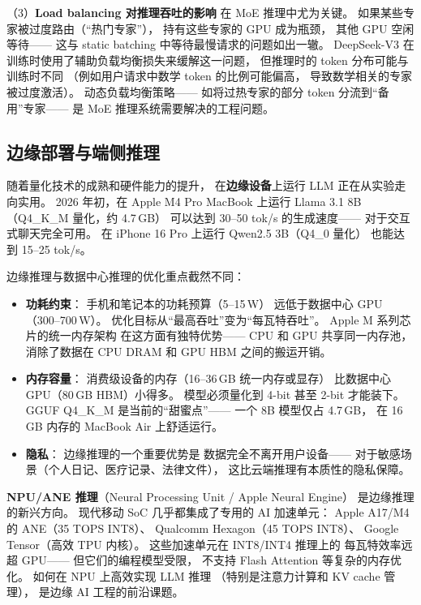 （3）\textbf{Load balancing 对推理吞吐的影响}
在 MoE 推理中尤为关键。
如果某些专家被过度路由（“热门专家”），
持有这些专家的 GPU 成为瓶颈，
其他 GPU 空闲等待——
这与 static batching 中等待最慢请求的问题如出一辙。
DeepSeek-V3 在训练时使用了辅助负载均衡损失来缓解这一问题，
但推理时的 token 分布可能与训练时不同
（例如用户请求中数学 token 的比例可能偏高，
导致数学相关的专家被过度激活）。
动态负载均衡策略——
如将过热专家的部分 token 分流到“备用”专家——
是 MoE 推理系统需要解决的工程问题。

\subsection{边缘部署与端侧推理}

随着量化技术的成熟和硬件能力的提升，
在\textbf{边缘设备}上运行 LLM 正在从实验走向实用。
2026 年初，在 Apple M4 Pro MacBook 上运行
Llama 3.1 8B（Q4\_K\_M 量化，约 4.7\,GB）
可以达到 30--50 tok/s 的生成速度——
对于交互式聊天完全可用。
在 iPhone 16 Pro 上运行 Qwen2.5 3B（Q4\_0 量化）
也能达到 15--25 tok/s。

边缘推理与数据中心推理的优化重点截然不同：
\begin{itemize}[noitemsep]
  \item \textbf{功耗约束}：
        手机和笔记本的功耗预算（5--15\,W）
        远低于数据中心 GPU（300--700\,W）。
        优化目标从“最高吞吐”变为“每瓦特吞吐”。
        Apple M 系列芯片的统一内存架构
        在这方面有独特优势——
        CPU 和 GPU 共享同一内存池，
        消除了数据在 CPU DRAM 和 GPU HBM 之间的搬运开销。
  \item \textbf{内存容量}：
        消费级设备的内存（16--36\,GB 统一内存或显存）
        比数据中心 GPU（80\,GB HBM）小得多。
        模型必须量化到 4-bit 甚至 2-bit 才能装下。
        GGUF Q4\_K\_M 是当前的“甜蜜点”——
        一个 8B 模型仅占 4.7\,GB，
        在 16\,GB 内存的 MacBook Air 上舒适运行。
  \item \textbf{隐私}：
        边缘推理的一个重要优势是
        数据完全不离开用户设备——
        对于敏感场景（个人日记、医疗记录、法律文件），
        这比云端推理有本质性的隐私保障。
\end{itemize}

\textbf{NPU/ANE 推理}（Neural Processing Unit / Apple Neural Engine）
是边缘推理的新兴方向。
现代移动 SoC 几乎都集成了专用的 AI 加速单元：
Apple A17/M4 的 ANE（35 TOPS INT8）、
Qualcomm Hexagon（45 TOPS INT8）、
Google Tensor（高效 TPU 内核）。
这些加速单元在 INT8/INT4 推理上的
每瓦特效率远超 GPU——
但它们的编程模型受限，
不支持 Flash Attention 等复杂的内存优化。
如何在 NPU 上高效实现 LLM 推理
（特别是注意力计算和 KV cache 管理），
是边缘 AI 工程的前沿课题。

